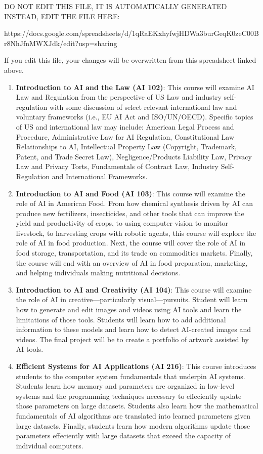
DO NOT EDIT THIS FILE, IT IS AUTOMATICALLY GENERATED
INSTEAD, EDIT THE FILE HERE:

https://docs.google.com/spreadsheets/d/1qRaEKxhyfwjHDWa3burGeqK0zeC00Br8NhJfnMWXJdk/edit?usp=sharing

If you edit this file, your changes will be overwritten from this spreadsheet
linked above.

\begin{enumerate}
\item \textbf{Introduction to AI and the Law (AI 102)}: This course will examine AI Law and Regulation from the perspective of US Law and industry self-regulation with some discussion of select relevant international law and voluntary frameworks (i.e., EU AI Act and ISO/UN/OECD). Specific topics of US and international law may include: American Legal Process and Procedure, Administrative Law for AI Regulation, Constitutional Law Relationships to AI, Intellectual Property Law (Copyright, Trademark, Patent, and Trade Secret Law), Negligence/Products Liability Law, Privacy Law and Privacy Torts, Fundamentals of Contract Law, Industry Self-Regulation and International Frameworks.
\item \textbf{Introduction to AI and Food (AI 103)}: This course will examine the role of AI in American Food.  From how chemical synthesis driven by AI can produce new fertilizers, insecticides, and other tools that can improve the yield and productivity of crops, to using computer vision to monitor livestock, to harvesting crops with robotic agents, this course will explore the role of AI in food production.  Next, the course will cover the role of AI in food storage, transportation, and its trade on commodities markets.  Finally, the course will end with an overview of AI in food preparation, marketing, and helping individuals making nutritional decisions.
\item \textbf{Introduction to AI and Creativity (AI 104)}: This course will examine the role of AI in creative---particularly visual---pursuits.  Student will learn how to generate and edit images and videos using AI tools and learn the limitations of those tools.  Students will learn how to add additional information to these models and learn how to detect AI-created images and videos.  The final project will be to create a portfolio of artwork assisted by AI tools.
\item \textbf{Efficient Systems for AI Applications (AI 216)}: This course introduces students to the computer system fundamentals that underpin AI systems.  Students learn how memory and parameters are organized in low-level systems and the programming techniques necessary to effeciently update those parameters on large datasets.  Students also learn how the mathematical fundamentals of AI algorithms are translated into learned parameters given large datasets.  Finally, students learn how modern algorithms update those parameters effeciently with large datasets that exceed the capacity of individual computers.

\end{enumerate}
